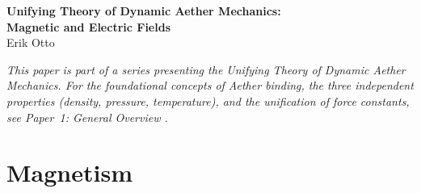 ﻿\documentclass[12pt,letterpaper]{article}
\begin{document}
\begin{center}
{\LARGE\bfseries Unifying Theory of Dynamic Aether Mechanics:\\
Magnetic and Electric Fields}\\[1em]
{\large Erik Otto}
\end{center}

\vspace{1em}

\begin{abstract}
Within the Dynamic Aether Mechanics framework, the electric field is identified as the
Aether flow vector---the instantaneous direction and magnitude of the medium's
displacement---while the magnetic field is the flow angle---the rotational geometry or
vorticity of that flow.\ The flow vector is sourced by the condensate's spin sector: a coherent,
net-zero-mass-flux spin-phase pump driven by the rotating winding of the bound
core ring of each charged particle,
with charge sign determined by whether the ring co-rotates (electron) or counter-
rotates (positron) with its surrounding vortex.\ This paper develops the electromagnetic
mechanism on this basis, derives the inverse-cube falloff of magnetic dipole fields,
explains ferromagnetism through Coulomb energy and Pauli exclusion, and accounts for
the Meissner effect.  Electromagnetic unification follows naturally: a stationary
charge produces a spherically symmetric wave field ($\mathbf{E}$ only), but motion
Doppler-tilts the wavefronts so that angular structure emerges ($\mathbf{B}$ appears),
with the conversion factor $v^2/c^2$ recovered from two first-order Doppler factors.
The identity $\nabla \cdot \mathbf{B} \equiv 0$ becomes a mathematical tautology
$\nabla \cdot (\nabla \times \mathbf{v}) \equiv 0$, explaining why magnetic monopoles
cannot exist.
\end{abstract}

\vspace{1em}

\bigskip
\noindent\textit{This paper is part of a series presenting the Unifying Theory of
Dynamic Aether Mechanics.  For the foundational concepts of Aether binding,
the three independent properties (density, pressure, temperature), and the
unification of force constants, see Paper~1: General Overview \cite{otto-overview}.}
\bigskip

\section{Magnetism}
\label{sec:magnetism}
\end{document}
